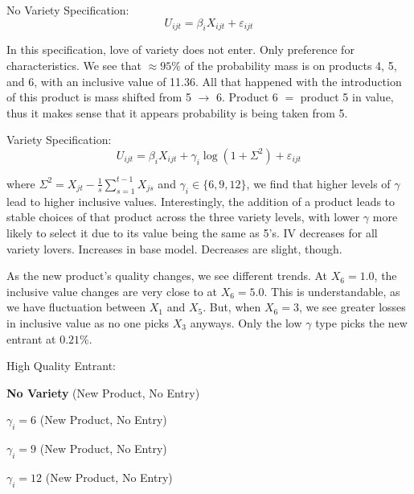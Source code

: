 \documentclass{article}
\begin{document}
No Variety Specification:
\begin{equation*}
  U_{ijt} = \beta_iX_{ijt} + \varepsilon_{ijt}
\end{equation*}

In this specification, love of variety does not enter. Only preference for characteristics. We see that $\approx95\%$ of the probability mass is on products 4, 5, and 6, with an inclusive value of 11.36. All that happened with the introduction of this product is mass shifted from 5 $\rightarrow$ 6. Product 6 $=$ product 5 in value, thus it makes sense that it appears probability is being taken from 5. 

Variety Specification:
\begin{equation*}
  U_{ijt} = \beta_iX_{ijt} + \gamma_i\log(1+\Sigma^2) + \varepsilon_{ijt}
\end{equation*}

where $\Sigma^2 = X_{jt} - \frac{1}{s}\sum_{s=1}^{t-1}X_{js}$ and $\gamma_i\in\{6, 9, 12\}$, we find that higher levels of $\gamma$ lead to higher inclusive values. Interestingly, the addition of a product leads to stable choices of that product across the three variety levels, with lower $\gamma$ more likely to select it due to its value being the same as 5's. IV decreases for all variety lovers. Increases in base model. Decreases are slight, though.

As the new product's quality changes, we see different trends. At $X_6=1.0$, the inclusive value changes are very close to at $X_6=5.0$. This is understandable, as we have fluctuation between $X_1$ and $X_5$. But, when $X_6=3$, we see greater losses in inclusive value as no one picks $X_3$ anyways. Only the low $\gamma$ type picks the new entrant at $0.21\%$.

\clearpage

High Quality Entrant:

\textbf{No Variety} (New Product, No Entry)



\textbf{$\gamma_i=6$} (New Product, No Entry)



\textbf{$\gamma_i=9$} (New Product, No Entry)



\textbf{$\gamma_i=12$} (New Product, No Entry)


\end{document}
